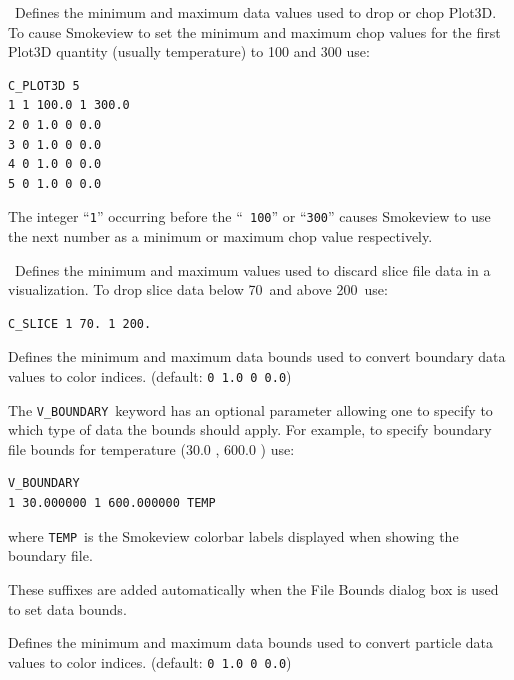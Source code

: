 \documentclass[11pt,twoside]{book}
\newcommand{\hitem}[1]{\item[{\bf #1} \hfill]}
\newcommand{\hitemNULL}[1]{}
\begin{document}
\hitem{C\_PLOT3D}\ Defines the minimum and maximum data values used
to drop or chop Plot3D.  To cause Smokeview to set the minimum and
maximum chop values for the first Plot3D quantity (usually
temperature) to 100 and 300 use:

\begin{lstlisting}
C_PLOT3D 5
1 1 100.0 1 300.0
2 0 1.0 0 0.0
3 0 1.0 0 0.0
4 0 1.0 0 0.0
5 0 1.0 0 0.0
\end{lstlisting}

\noindent The integer ``{\tt 1}'' occurring before the ``{\tt
100}'' or ``{\tt 300}'' causes Smokeview to use the next number as
a minimum or maximum chop value respectively.

\hitem{C\_SLICE}\ Defines the minimum and maximum values used to
discard slice file data in a visualization. To drop slice data
below 70\degC\ and above 200\degC\ use:

\begin{lstlisting}
C_SLICE 1 70. 1 200.
\end{lstlisting}

\hitemNULL{CACHE\_BOUNDARYDATA}

\hitemNULL{CACHE\_QDATA}

\hitemNULL{PATCHDATAOUT}

\hitemNULL{PERCENTILELEVEL}

\hitemNULL{SLICEDATAOUT}

\hitemNULL{TIMEOFFSET}

\hitemNULL{TLOAD}

\hitem{V\_BOUNDARY}Defines the minimum and maximum
data bounds used to convert boundary data values to color indices.
(default: {\tt 0 1.0 0 0.0})

The {\tt V\_BOUNDARY}\ keyword has an optional parameter allowing
one to specify to which type of data the bounds should apply. For
example, to specify boundary file bounds for temperature (30.0
\degC, 600.0 \degC) use:
\begin{lstlisting}
V_BOUNDARY
1 30.000000 1 600.000000 TEMP
\end{lstlisting}
where {\tt TEMP}\ is the Smokeview colorbar labels displayed when
showing the boundary file.

These suffixes are added automatically when the File Bounds
dialog box is used to set data bounds.

\hitem{V\_PARTICLES}Defines the minimum and maximum
data bounds used to convert particle data values to color indices.
(default: {\tt 0 1.0 0 0.0})
\end{document}
